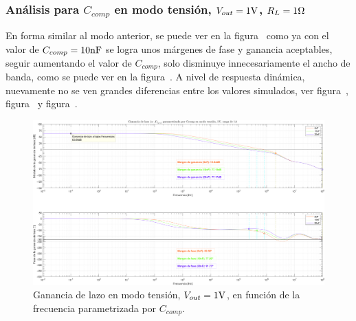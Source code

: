 \clearpage


\subsubsection{Análisis para $C_{comp}$ en modo tensión, $V_{out} = 1 \si[per-mode=symbol]{\volt}$, $R_{L} = 1 \si[per-mode=symbol]{\ohm}$}

En forma similar al modo anterior, se puede ver en la figura~ como ya con el valor de $C_{comp} = 10 \si[per-mode=symbol]{\nano\farad}$ se logra unos márgenes de fase y ganancia aceptables, seguir aumentando el valor de $C_{comp}$, solo disminuye innecesariamente el ancho de banda, como se puede ver en la figura~. A nivel de respuesta dinámica, nuevamente no se ven grandes diferencias entre los valores simulados, ver figura~, figura~ y figura~.

\vfill



\clearpage

\begin{figure}[H] %
\begin{center}
\includegraphics[width=1.1 \textwidth, angle=90]{./img/plots/loop/power_supply_CCOMP_LOOP_Modo2.png}
\caption{\label{fig:fig_power_supply_CCOMP_LOOP_Modo2}\footnotesize{Ganancia de lazo en modo tensión, $V_{out} = 1 \si[per-mode=symbol]{\volt}$, en función de la frecuencia parametrizada por $C_{comp}$.}}
\end{center}
\end{figure}


\clearpage

